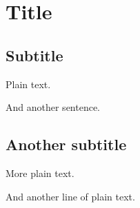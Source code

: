 \documentclass{article}
\begin{document}
\section{Title}



\subsection{Subtitle}

Plain text.

And another sentence.

\subsection{Another subtitle}

More plain text.

And another line of plain text.
\end{document}
